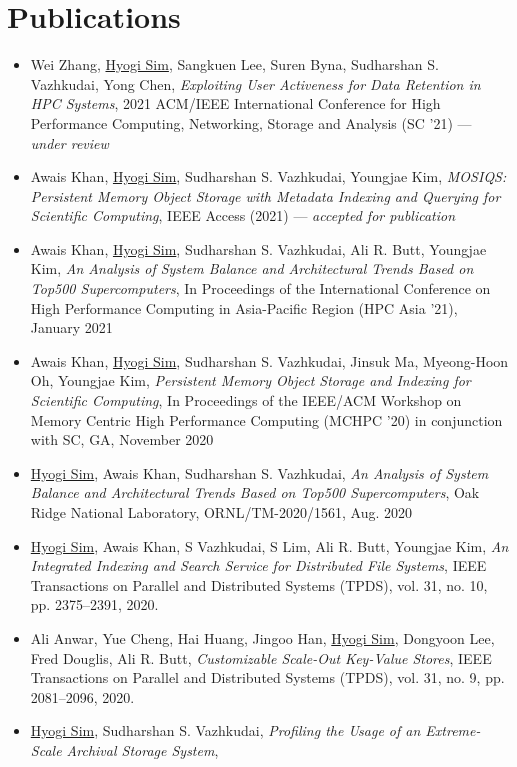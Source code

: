 \section{Publications}
\begin{itemize}
\item Wei Zhang, \underline{Hyogi Sim}, Sangkuen Lee, Suren Byna, Sudharshan S. Vazhkudai, Yong Chen,
  {\it Exploiting User Activeness for Data Retention in HPC Systems},
  2021 ACM/IEEE International Conference for High
  Performance Computing, Networking, Storage and Analysis (SC '21)
  --- \emph{under review}
\item Awais Khan, \underline{Hyogi Sim}, Sudharshan S. Vazhkudai, Youngjae Kim,
  {\it MOSIQS: Persistent Memory Object Storage with Metadata Indexing and Querying for Scientific Computing},
  IEEE Access (2021) --- \emph{accepted for publication}
\item Awais Khan, \underline{Hyogi Sim}, Sudharshan S. Vazhkudai, Ali R. Butt, Youngjae Kim,
  {\it An Analysis of System Balance and Architectural Trends Based on Top500 Supercomputers},
  In Proceedings of the International Conference on High Performance Computing in Asia-Pacific Region
  (HPC Asia '21), January 2021
\item Awais Khan, \underline{Hyogi Sim}, Sudharshan S. Vazhkudai, Jinsuk Ma, Myeong-Hoon Oh, Youngjae Kim,
  {\it Persistent Memory Object Storage and Indexing for Scientific Computing},
  In Proceedings of the IEEE/ACM Workshop on Memory Centric High Performance Computing (MCHPC '20)
  in conjunction with SC, GA, November 2020
\item \underline{Hyogi Sim}, Awais Khan, Sudharshan S. Vazhkudai,
  {\it An Analysis of System Balance and Architectural Trends Based on Top500 Supercomputers},
  Oak Ridge National Laboratory, ORNL/TM-2020/1561, Aug. 2020
\item \underline{Hyogi Sim}, Awais Khan, S Vazhkudai, S Lim, Ali R. Butt, Youngjae Kim,
  {\it An Integrated Indexing and Search Service for Distributed File Systems},
  IEEE Transactions on Parallel and Distributed Systems (TPDS), 
  vol. 31, no. 10, pp. 2375–2391, 2020.
\item Ali Anwar, Yue Cheng, Hai Huang, Jingoo Han, \underline{Hyogi Sim},
      Dongyoon Lee, Fred Douglis, Ali R. Butt,
  {\it Customizable Scale-Out Key-Value Stores},
  IEEE Transactions on Parallel and Distributed Systems (TPDS),
  vol. 31, no. 9, pp. 2081–2096, 2020.
\item \underline{Hyogi Sim}, Sudharshan S. Vazhkudai,
  {\it Profiling the Usage of an Extreme-Scale Archival Storage System},

\end{itemize}
